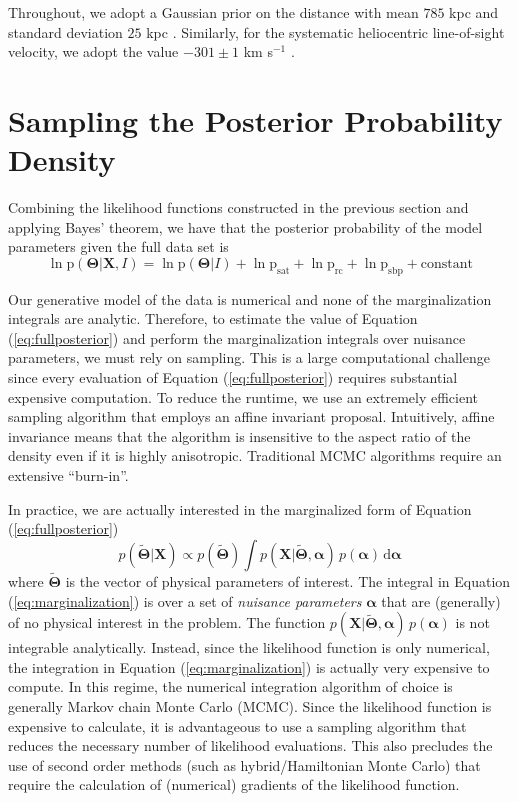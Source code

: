 \documentclass[preprint]{aastex}
\newcommand{\eqlabel}[1]{\label{eq:#1}}
\newcommand{\eq}[1]{Equation (\ref{eq:#1})}
\newcommand{\dd}{\mathrm{d}}
\begin{document}
Throughout, we adopt a Gaussian prior on the distance with mean $785$ kpc and
standard deviation $25$ kpc \citep{McConnachie:2005,McConnachie:2006}.  Similarly,
for the systematic heliocentric line-of-sight velocity, we adopt the value
$-301 \pm 1$ km s$^{-1}$ \citep{Courteau:1999}.

\section{Sampling the Posterior Probability Density}

Combining the likelihood functions constructed in the previous section and
applying Bayes' theorem, we have that the posterior probability of the model
parameters given the full data set is
\begin{equation}
    \eqlabel{fullposterior}
    \ln \mathrm{p} (\mathbf{\Theta} | \mathbf{X}, I) =
    \ln \mathrm{p} (\mathbf{\Theta} | I) +  \ln \mathrm{p}_\mathrm{sat}
    + \ln \mathrm{p}_\mathrm{rc}
    + \ln \mathrm{p}_\mathrm{sbp} + \mathrm{constant}
\end{equation}

Our generative model of the data is numerical and none of the marginalization
integrals are analytic. Therefore, to estimate the value of \eq{fullposterior}
and perform the marginalization integrals over nuisance parameters, we must
rely on sampling. This is a large computational challenge since every evaluation
of \eq{fullposterior} requires substantial expensive computation. To reduce the
runtime, we use an extremely efficient sampling algorithm that employs an affine
invariant proposal. Intuitively, affine invariance means that the algorithm is
insensitive to the aspect ratio of the density even if it is highly anisotropic.
Traditional MCMC algorithms require an extensive ``burn-in''.

In practice, we are actually interested in the marginalized form of \eq{fullposterior}
\begin{equation}
    \eqlabel{marginalization}
    p (\tilde{\boldsymbol{\Theta}} | \mathbf{X}) \propto
        p (\tilde{\boldsymbol{\Theta}}) \int
        p (\mathbf{X} | \tilde{\boldsymbol{\Theta}},\boldsymbol{\alpha}) \,
        p (\boldsymbol{\alpha}) \, \dd \boldsymbol{\alpha}
\end{equation}
where $\tilde{\boldsymbol{\Theta}}$ is the vector of physical parameters of
interest. The integral in
\eq{marginalization} is over a set of \emph{nuisance parameters} $\boldsymbol{\alpha}$
that are (generally) of no physical interest in the problem. The function
$p (\mathbf{X} | \tilde{\boldsymbol{\Theta}},\boldsymbol{\alpha}) \, p (\boldsymbol{\alpha})$
is not integrable analytically. Instead, since the likelihood function is only
numerical, the integration in \eq{marginalization} is actually very expensive
to compute. In this regime, the numerical integration algorithm of choice is
generally Markov chain Monte Carlo (MCMC).
Since the likelihood function is expensive to calculate, it is advantageous to
use a sampling algorithm that reduces the necessary number of likelihood
evaluations. This also precludes the use of second order methods (such as
hybrid/Hamiltonian Monte Carlo) that require the calculation of (numerical)
gradients of the likelihood function.
\end{document}
